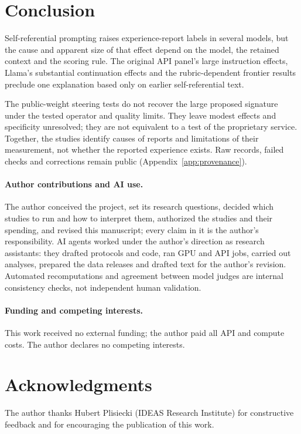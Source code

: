 \documentclass[11pt]{article}
\begin{document}
\section{Conclusion}

Self-referential prompting raises experience-report labels in several
models, but the cause and apparent size of that effect depend on the model,
the retained context and the scoring rule. The original API panel's large
instruction effects, Llama's substantial continuation effects and the
rubric-dependent frontier results preclude one explanation based only on
earlier self-referential text.

The public-weight steering tests do not recover the large proposed
signature under the tested operator and quality limits. They leave modest
effects and specificity unresolved; they are not equivalent to a test of
the proprietary service. Together, the studies identify causes of reports
and limitations of their measurement, not whether the reported experience
exists. Raw records, failed checks and corrections remain public
(Appendix~\ref{app:provenance}).

\paragraph{Author contributions and AI use.}
The author conceived the project, set its research questions, decided which
studies to run and how to interpret them, authorized the studies and their
spending, and revised this manuscript; every claim in it is the
author's responsibility. AI agents worked under the author's direction as research
assistants: they drafted protocols and code, ran GPU and API jobs, carried
out analyses, prepared the data releases and drafted text for the author's
revision. Automated recomputations and agreement between model judges are
internal consistency checks, not independent human validation.

\paragraph{Funding and competing interests.}
This work received no external funding; the author paid all API and compute
costs. The author declares no competing interests.

\section*{Acknowledgments}
The author thanks Hubert Plisiecki (IDEAS Research Institute) for
constructive feedback and for encouraging the publication of this work.
\end{document}
